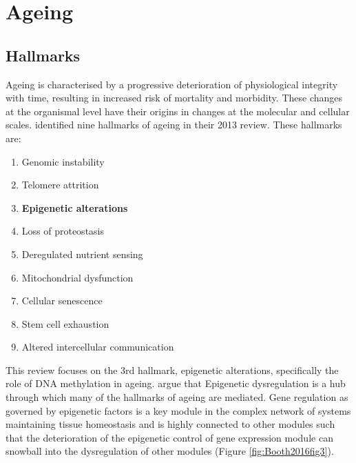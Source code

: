 \documentclass[
]{book}
\providecommand{\tightlist}{%
  \setlength{\itemsep}{0pt}\setlength{\parskip}{0pt}}
\begin{document}
\hypertarget{ageing}{%
\section{Ageing}\label{ageing}}

\hypertarget{hallmarks}{%
\subsection{Hallmarks}\label{hallmarks}}

Ageing is characterised by a progressive deterioration of physiological integrity with time, resulting in increased risk of mortality and morbidity. These changes at the organismal level have their origins in changes at the molecular and cellular scales. \citet{Lopez-Otin2013} identified nine hallmarks of ageing in their 2013 review. These hallmarks are:

\begin{enumerate}
\def\labelenumi{\arabic{enumi}.}
\tightlist
\item
  Genomic instability
\item
  Telomere attrition
\item
  \textbf{Epigenetic alterations}
\item
  Loss of proteostasis
\item
  Deregulated nutrient sensing
\item
  Mitochondrial dysfunction
\item
  Cellular senescence
\item
  Stem cell exhaustion
\item
  Altered intercellular communication
\end{enumerate}

This review focuses on the 3rd hallmark, epigenetic alterations, specifically the role of DNA methylation in ageing. \citet{Booth2016} argue that Epigenetic dysregulation is a hub through which many of the hallmarks of ageing are mediated. Gene regulation as governed by epigenetic factors is a key module in the complex network of systems maintaining tissue homeostasis and is highly connected to other modules such that the deterioration of the epigenetic control of gene expression module can snowball into the dysregulation of other modules (Figure \ref{fig:Booth2016fig3}).
\end{document}
